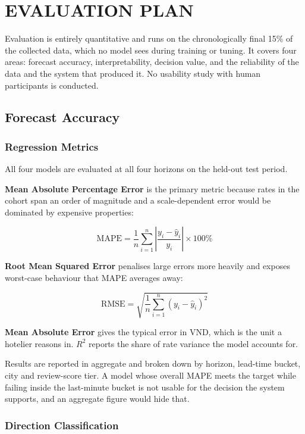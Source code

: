 \chapter{EVALUATION PLAN}

Evaluation is entirely quantitative and runs on the chronologically final 15\% of the collected data, which no model sees during training or tuning. It covers four areas: forecast accuracy, interpretability, decision value, and the reliability of the data and the system that produced it. No usability study with human participants is conducted.

\section{Forecast Accuracy}

\subsection{Regression Metrics}

All four models are evaluated at all four horizons on the held-out test period.

\textbf{Mean Absolute Percentage Error} is the primary metric because rates in the cohort span an order of magnitude and a scale-dependent error would be dominated by expensive properties:

\[
\text{MAPE} = \frac{1}{n} \sum_{i=1}^{n} \left| \frac{y_i - \hat{y}_i}{y_i} \right| \times 100\%
\]

\textbf{Root Mean Squared Error} penalises large errors more heavily and exposes worst-case behaviour that MAPE averages away:

\[
\text{RMSE} = \sqrt{\frac{1}{n} \sum_{i=1}^{n} (y_i - \hat{y}_i)^2}
\]

\textbf{Mean Absolute Error} gives the typical error in VND, which is the unit a hotelier reasons in. \textbf{$R^2$} reports the share of rate variance the model accounts for.

Results are reported in aggregate and broken down by horizon, lead-time bucket, city and review-score tier. A model whose overall MAPE meets the target while failing inside the last-minute bucket is not usable for the decision the system supports, and an aggregate figure would hide that.

\subsection{Direction Classification}

